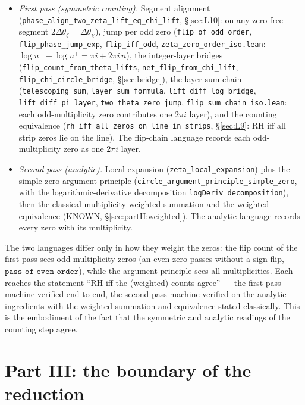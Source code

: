 \documentclass{article}
\newcommand{\zt}{\zeta}
\newcommand{\Xchi}{\chi}
\begin{document}
\begin{itemize}
\item \emph{First pass (symmetric counting).} Segment alignment
(\texttt{phase\_align\_two\_zeta\_lift\_eq\_chi\_lift}, \S\ref{sec:L10}:
on any zero-free segment
$2\Delta\theta_{\zt}=\Delta\theta_\Xchi$), jump per odd zero
(\texttt{flip\_of\_odd\_order}, \texttt{flip\_phase\_jump\_exp},
\texttt{flip\_iff\_odd},
\texttt{zeta\_zero\_order\_iso.lean}: $\log u^--\log u^+=\pi i+2\pi i\,n$),
the integer-layer bridges
(\texttt{flip\_count\_from\_theta\_lifts},
\texttt{net\_flip\_from\_chi\_lift},
\texttt{flip\_chi\_circle\_bridge}, \S\ref{sec:bridge}), the
layer-sum chain (\texttt{telescoping\_sum},
\texttt{layer\_sum\_formula}, \texttt{lift\_diff\_log\_bridge},
\texttt{lift\_diff\_pi\_layer}, \texttt{two\_theta\_zero\_jump},
\texttt{flip\_sum\_chain\_iso.lean}: each odd-multiplicity zero
contributes one $2\pi i$ layer), and the counting
equivalence (\texttt{rh\_iff\_all\_zeros\_on\_line\_in\_strips},
\S\ref{sec:L9}: RH iff all strip zeros lie on the line).
The flip-chain language records each odd-multiplicity zero as one
$2\pi i$ layer.
\item \emph{Second pass (analytic).} Local expansion (\texttt{zeta\_local\_expansion})
plus the simple-zero argument principle
(\texttt{circle\_argument\_principle\_simple\_zero}, with the
logarithmic-derivative decomposition \texttt{logDeriv\_decomposition}),
then the classical multiplicity-weighted summation and the weighted
equivalence (KNOWN, \S\ref{sec:partII:weighted}).
The analytic language records every zero with its multiplicity.
\end{itemize}

The two languages differ only in how they weight the zeros: the flip
count of the first pass sees odd-multiplicity zeros (an even zero passes
without a sign flip, $\texttt{pass\_of\_even\_order}$), while the
argument principle sees all multiplicities. Each reaches the statement
``RH iff the (weighted) counts agree'' --- the first pass machine-verified
end to end, the second pass machine-verified on the analytic ingredients
with the weighted summation and equivalence stated classically. This is
the embodiment of the fact that the symmetric and analytic
readings of the counting step agree.


\section{Part III: the boundary of the reduction}
\label{sec:partIII}
\end{document}
